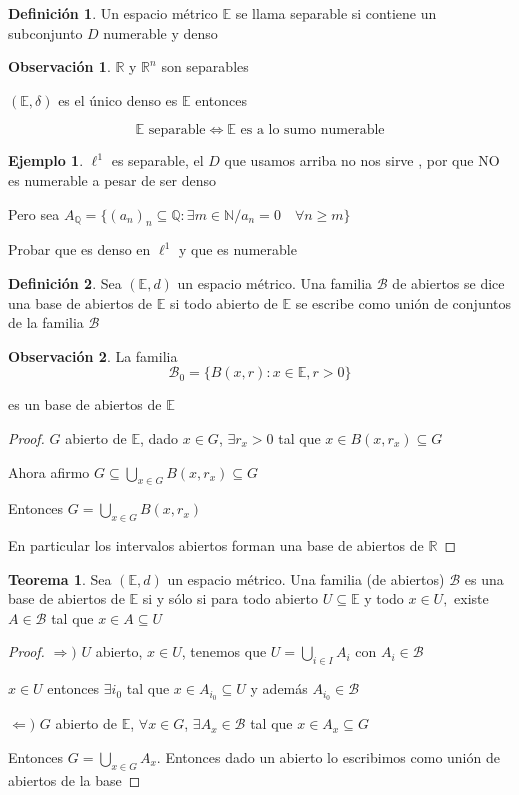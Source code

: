 \documentclass[12pt]{article}
\newcommand{\Q}{\mathbb{Q}}
\newcommand{\R}{\mathbb{R}}
\newcommand{\E}{\mathbb{E}}
\newcommand{\N}{\mathbb{N}}
\newcommand{\Ra}{\Rightarrow}
\theoremstyle{definition}
\newtheorem{definition}{Definición}[section]
\newtheorem*{remark}{Observación}
\newtheorem{theorem}{Teorema}
\newtheorem{ex}{Ejemplo}
\begin{document}
\begin{definition}
 Un espacio métrico $\E$ se llama separable si contiene un subconjunto $D$ numerable y denso 
\end{definition}
\begin{remark}
  $\R$ y $\R^n$ son separables

  $(\E,\delta)$ es el único denso es $\E$ entonces 

  $$\E  \text{ separable} \iff \E \text{ es a lo sumo numerable}$$
\end{remark}
\begin{ex}
  $\ell^1$ es separable, el $D$ que usamos arriba no nos sirve , por que NO es numerable a pesar de ser denso

  Pero sea $A_{\Q}=\{(a_n)_n \subseteq \Q :\exists m\in \N / a_n = 0 \quad \forall n \geq m\}$

  Probar que es denso en $\ell^1$ y que es numerable
\end{ex}
\begin{definition}
  Sea $(\E,d)$ un espacio métrico. Una familia $\mathcal{B}$ de abiertos se dice una base de abiertos de $\E$ si todo abierto de $\E$ se escribe como unión de conjuntos de la familia $\mathcal{B}$ 
\end{definition}
\begin{remark}
  La familia $$ \mathcal{B}_0 = \{B(x,r) : x \in \E, r>0\}$$

  es un base de abiertos de $\E$
  \begin{proof}
    $G$ abierto de $\E$, dado $x \in G$, $\exists r_x >0 $ tal que $x \in B(x,r_x) \subseteq G$ 

    Ahora afirmo $G \subseteq \bigcup_{x \in G}B(x,r_x) \subseteq G$

    Entonces $G = \bigcup_{x \in G}B(x,r_x)$

    En particular los intervalos abiertos forman una base de abiertos de $\R$
  \end{proof}
\end{remark}
\begin{theorem}
  Sea $(\E,d)$ un espacio métrico. Una familia (de abiertos) $\mathcal{B}$ es una base de abiertos de $\E$ si y sólo si para todo abierto $U \subseteq \E$ y todo $x \in U,$ existe $A \in \mathcal{B}$ tal que $x \in A \subseteq U$
  \begin{proof}
  $\Ra )$ $U$ abierto, $x \in U$, tenemos que $U = \bigcup_{i \in I} A_i$ con $A_i \in \mathcal{B}$

  $x \in U$ entonces $\exists i_0 $ tal que $x \in A_{i_0}\subseteq U$ y además $A_{i_0} \in \mathcal B$

$\Leftarrow )$ $G$ abierto de $\E$, $\forall x \in G$, $\exists A_x \in \mathcal{B}$ tal que $x \in A_x \subseteq G$

Entonces $G = \bigcup_{x\in G}A_x$. Entonces dado un abierto lo escribimos como unión de abiertos de la base
  \end{proof}
\end{theorem}
\end{document}
